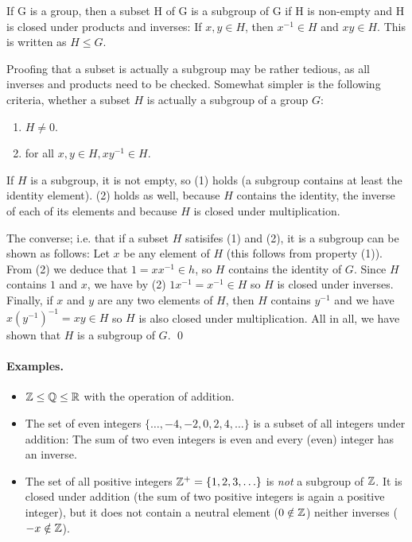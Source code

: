 

\begin{definition}[Subgroup]
  If G is a group, then a subset H of G is a subgroup of G if H is non-empty and H is closed under products and inverses: If $x,y \in H$, then $x^{-1} \in H$ and $xy \in H$. This is written as $H \leq G$.
\end{definition}

Proofing that a subset is actually a subgroup may be rather tedious, as all inverses and products need to be checked. Somewhat simpler is the following criteria, whether a subset $H$ is actually a subgroup of a group $G$:

\begin{enumerate}
    \item $H \neq 0$.
    \item for all $x,y \in H, xy^{-1} \in H$.
\end{enumerate}

If $H$ is a subgroup, it is not empty, so (1) holds (a subgroup contains at least the identity element). (2) holds as well, because $H$ contains the identity, the inverse of each of its elements and because $H$ is closed under multiplication.

The converse; i.e. that if a subset $H$ satisifes (1) and (2), it is a subgroup can be shown as follows: Let $x$ be any element of $H$ (this follows from property (1)). From (2) we deduce that $1 = xx^{-1} \in h$, so $H$ contains the identity of $G$. Since $H$ contains $1$ and $x$, we have by (2) $1 x^{-1} = x^{-1} \in H$ so $H$ is closed under inverses. Finally, if $x$ and $y$ are any two elements of $H$, then $H$ contains $y^{-1}$ and we have $x(y^{-1})^{-1} = xy \in H$ so $H$ is also closed under multiplication. All in all, we have shown that $H$ is a subgroup of $G$. \qed


\paragraph{Examples.}

\begin{itemize}
\item $\mathbb{Z} \leq \mathbb{Q} \leq \mathbb{R}$ with the operation of addition.

\item The set of even integers $\{\ldots, -4, -2, 0, 2, 4, \ldots\}$ is a subset of all integers under addition: The sum of two even integers is even and every (even) integer has an inverse.

\item The set of all positive integers $\mathbb{Z}^+ = \{1,2,3,\ldots\}$ is \emph{not} a subgroup of $\mathbb{Z}$. It is closed under addition (the sum of two positive integers is again a positive integer), but it does not contain a neutral element ($0 \notin \mathbb{Z}$) neither inverses ($-x \notin \mathbb{Z}$).

\end{itemize}


